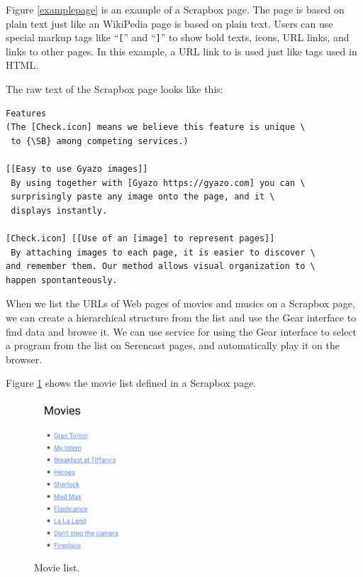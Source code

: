 \documentclass{article}
\def\SC{\textsf{\small Serencast}}
\def\SB{\textsf{\small Scrapbox}}
\begin{document}
Figure \ref{examplepage} is an example of a {\SB} page.
%
The page is based on plain text just like an WikiPedia page is based on plain text.
Users can use special markup tags
like ``\texttt{[}'' and ``\texttt{]}'' to show bold texts, icons, URL links,
and links to other pages.
In this example, a URL link to {} is used
just like  tags used in HTML.

The raw text of the {\SB} page looks like this:

{\scriptsize
\begin{verbatim}
Features
(The [Check.icon] means we believe this feature is unique \
 to {\SB} among competing services.)

[[Easy to use Gyazo images]]
 By using together with [Gyazo https://gyazo.com] you can \
 surprisingly paste any image onto the page, and it \
 displays instantly.

[Check.icon] [[Use of an [image] to represent pages]]
 By attaching images to each page, it is easier to discover \
and remember them. Our method allows visual organization to \
happen spontanteously.
\end{verbatim}
}

When we list the URLs of Web pages of
movies and musics on a {\SB} page,
we can create a hierarchical structure from the list and
use the Gear interface to find data and browse it.
We can use  service
for using the Gear interface to select a program from the
list on {\SC} pages, and automatically play it on the browser.

Figure \ref{movielist} shows the movie list defined in a {\SB} page.

\begin{figure}[H]
\centerline{\includegraphics[width=40mm,bb=0 0 387 568]{figures/2b97930bf5730fcaf4d9c0adeb9c5f6e.png}}
\caption{Movie list.}
\label{movielist}
\end{figure}
\end{document}
